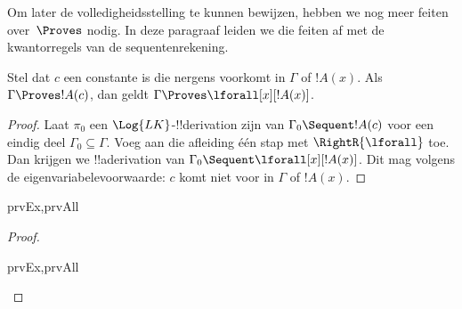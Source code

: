\documentclass[../../../include/open-logic-section]{subfiles}
\begin{document}

\begin{explain}
  Om later de volledigheidsstelling te kunnen bewijzen, hebben we nog
  meer feiten over~$\Proves$ nodig. In deze paragraaf leiden we die
  feiten af met de kwantorregels van de sequentenrekening.
\end{explain}

\begin{thm}
 Stel dat $c$ een constante is die
nergens voorkomt in $\Gamma$ of $!A(x)$. Als $\Gamma \Proves !A(c)$,
dan geldt $\Gamma \Proves \lforall[x][!A(x)]$.
\end{thm}

\begin{proof}
Laat $\pi_0$ een $\Log{LK}$-!!{derivation} zijn van $\Gamma_0 \Sequent
!A(c)$ voor een eindig deel $\Gamma_0 \subseteq \Gamma$. Voeg aan die
afleiding één stap met $\RightR{\lforall}$ toe. Dan krijgen we !!a{derivation} van $\Gamma_0
\Sequent \lforall[x][!A(x)]$. Dit mag volgens de
eigenvariabelevoorwaarde: $c$ komt niet voor in $\Gamma$ of $!A(x)$.
\end{proof}

\begin{prop}
\begin{tagenumerate}{prvEx,prvAll}
\end{tagenumerate}
\end{prop}

\begin{proof}
\begin{tagenumerate}{prvEx,prvAll}
\end{tagenumerate}
\end{proof}
\end{document}
